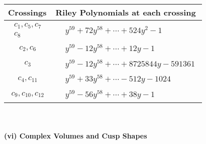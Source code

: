 \documentclass[1p]{elsarticle_modified}
\theoremstyle{definition}
\begin{document}
\begin{tabular}{m{50pt}|m{274pt}}
Crossings & \hspace{64pt}Riley Polynomials at each crossing \\
\hline $$\begin{aligned}c_{1},c_{5},c_{7}\\c_{8}\end{aligned}$$&$\begin{aligned}
&y^{59}+72 y^{58}+\cdots+524 y^2-1
\end{aligned}$\\
\hline $$\begin{aligned}c_{2},c_{6}\end{aligned}$$&$\begin{aligned}
&y^{59}-12 y^{58}+\cdots+12 y-1
\end{aligned}$\\
\hline $$\begin{aligned}c_{3}\end{aligned}$$&$\begin{aligned}
&y^{59}-12 y^{58}+\cdots+8725844 y-591361
\end{aligned}$\\
\hline $$\begin{aligned}c_{4},c_{11}\end{aligned}$$&$\begin{aligned}
&y^{59}+33 y^{58}+\cdots-512 y-1024
\end{aligned}$\\
\hline $$\begin{aligned}c_{9},c_{10},c_{12}\end{aligned}$$&$\begin{aligned}
&y^{59}-56 y^{58}+\cdots+38 y-1
\end{aligned}$\\
\hline
\end{tabular}\\~\\
\newpage\flushleft \textbf{(vi) Complex Volumes and Cusp Shapes}
\end{document}
